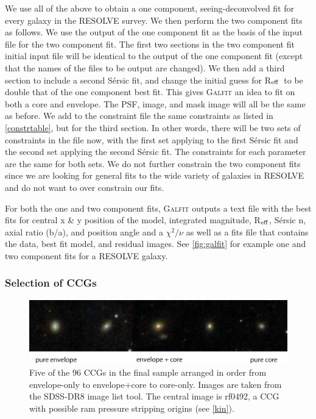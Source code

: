 \documentclass[iop,apj]{emulateapj}
\newcommand{\Reff}{R$_{\rm eff}$}
\begin{document}
\noindent We use all of the above to obtain a one component, seeing-deconvolved fit for every galaxy in the RESOLVE survey. We then perform the two component fits as follows. We use the output of the one component fit as the basis of the input file for the two component fit. The first two sections in the two component fit initial input file will be identical to the output of the one component fit (except that the names of the files to be output are changed). We then add a third section to include a second S\'ersic fit, and change the initial guess for \Reff\ to be double that of the one component best fit. This gives \textsc{Galfit} an idea to fit on both a core and envelope. The PSF, image, and mask image will all be the same as before. We add to the constraint file the same constraints as listed in \autoref{constrtable}, but for the third section. In other words, there will be two sets of constraints in the file now, with the first set applying to the first S\'ersic fit and the second set applying the second S\'ersic fit. The constraints for each parameter are the same for both sets. We do not further constrain the two component fits since we are looking for general fits to the wide variety of galaxies in RESOLVE and do not want to over constrain our fits.

For both the one and two component fits, \textsc{Galfit} outputs a text file with the best fits for central x \& y position of the model, integrated magnitude, \Reff, S\'ersic n, axial ratio (b/a), and position angle and a $\chi^2/\nu$ as well as a fits file that contains the data, best fit model, and residual images. See \autoref{fig:galfit} for example one and two component fits for a RESOLVE galaxy.

\subsubsection{Selection of CCGs}
\label{CCGs}

\begin{figure}[hbpt!]
\begin{center}
\includegraphics{CCGpics.eps}
\caption{Five of the 96 CCGs in the final sample arranged in order from envelope-only to envelope+core to core-only. Images are taken from the SDSS-DR8 image list tool. The central image is rf0492, a CCG with possible ram pressure stripping origins (see \autoref{kin}).}
\label{fig:pics}
\end{center}
\end{figure}
\end{document}

